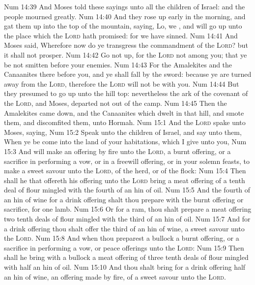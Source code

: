 \vs Num 14:39 And Moses told these sayings unto all the children of Israel: and the people mourned greatly.
\vs Num 14:40 And they rose up early in the morning, and gat them up into the top of the mountain, saying, Lo, we , and will go up unto the place which the \textsc{Lord} hath promised: for we have sinned.
\vs Num 14:41 And Moses said, Wherefore now do ye transgress the commandment of the \textsc{Lord}? but it shall not prosper.
\vs Num 14:42 Go not up, for the \textsc{Lord}  not among you; that ye be not smitten before your enemies.
\vs Num 14:43 For the Amalekites and the Canaanites  there before you, and ye shall fall by the sword: because ye are turned away from the \textsc{Lord}, therefore the \textsc{Lord} will not be with you.
\vs Num 14:44 But they presumed to go up unto the hill top: nevertheless the ark of the covenant of the \textsc{Lord}, and Moses, departed not out of the camp.
\vs Num 14:45 Then the Amalekites came down, and the Canaanites which dwelt in that hill, and smote them, and discomfited them,  unto Hormah.
\vs Num 15:1 And the \textsc{Lord} spake unto Moses, saying,
\vs Num 15:2 Speak unto the children of Israel, and say unto them, When ye be come into the land of your habitations, which I give unto you,
\vs Num 15:3 And will make an offering by fire unto the \textsc{Lord}, a burnt offering, or a sacrifice in performing a vow, or in a freewill offering, or in your solemn feasts, to make a sweet savour unto the \textsc{Lord}, of the herd, or of the flock:
\vs Num 15:4 Then shall he that offereth his offering unto the \textsc{Lord} bring a meat offering of a tenth deal of flour mingled with the fourth  of an hin of oil.
\vs Num 15:5 And the fourth  of an hin of wine for a drink offering shalt thou prepare with the burnt offering or sacrifice, for one lamb.
\vs Num 15:6 Or for a ram, thou shalt prepare  a meat offering two tenth deals of flour mingled with the third  of an hin of oil.
\vs Num 15:7 And for a drink offering thou shalt offer the third  of an hin of wine,  a sweet savour unto the \textsc{Lord}.
\vs Num 15:8 And when thou preparest a bullock  a burnt offering, or  a sacrifice in performing a vow, or peace offerings unto the \textsc{Lord}:
\vs Num 15:9 Then shall he bring with a bullock a meat offering of three tenth deals of flour mingled with half an hin of oil.
\vs Num 15:10 And thou shalt bring for a drink offering half an hin of wine,  an offering made by fire, of a sweet savour unto the \textsc{Lord}.
